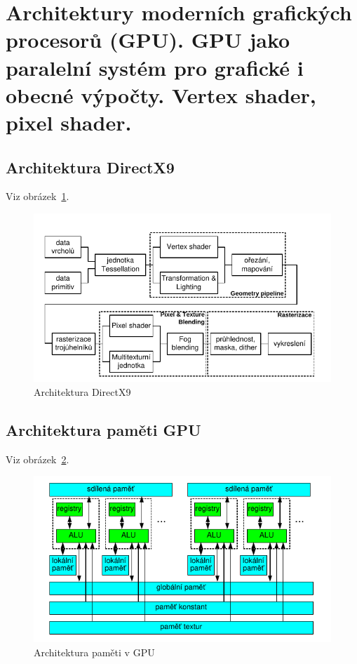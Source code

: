 \section{Architektury moderních grafických procesorů (GPU). GPU jako paralelní systém pro grafické i obecné výpočty. Vertex shader, pixel shader.}

\subsection{Architektura DirectX9}
Viz obrázek~\ref{fig:architektura-gpu}.
\begin{figure}
    \centering
    \includegraphics[width=\linewidth]{obrazky/architekturaGPU.png}
    \caption{Architektura DirectX9}
    \label{fig:architektura-gpu}
\end{figure}

\subsection{Architektura paměti GPU}
Viz obrázek~\ref{fig:architektura-pamet}.
\begin{figure}
    \centering
    \includegraphics[width=\linewidth]{obrazky/architektura-pamet-gpu.png}
    \caption{Architektura paměti v GPU}
    \label{fig:architektura-pamet}
\end{figure}

